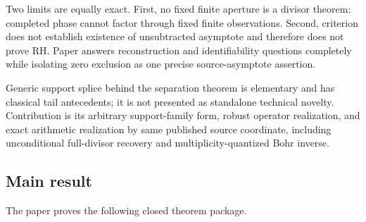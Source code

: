 \documentclass[11pt]{article}
\theoremstyle{definition}
\theoremstyle{remark}
\begin{document}
Two limits are equally exact.  First, no fixed finite aperture is a divisor theorem: completed
phase cannot factor through fixed finite observations.  Second, criterion does not establish
existence of unsubtracted asymptote and therefore does not prove RH.  Paper answers reconstruction
and identifiability questions completely while isolating zero exclusion as one precise
source-asymptote assertion.

Generic support splice behind the separation theorem is elementary and has classical tail
antecedents; it is not presented as standalone technical novelty.  Contribution is its arbitrary
support-family form, robust operator realization, and exact arithmetic realization by same
published source coordinate, including unconditional full-divisor recovery and
multiplicity-quantized Bohr inverse.

\subsection*{Main result}

The paper proves the following closed theorem package.
\end{document}
